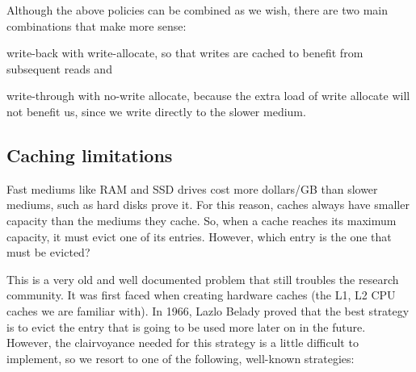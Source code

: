 Although the above policies can be combined as we wish, there are two main 
combinations that make more sense:
\begin{inparaenum}[i)]
\item write-back with write-allocate, so that writes are cached to benefit from 
	subsequent reads and
\item write-through with no-write allocate, because the extra load of write 
	allocate will not benefit us, since we write directly to the slower 
	medium.
\end{inparaenum}

\subsection{Caching limitations}

Fast mediums like RAM and SSD drives cost more dollars/GB than slower mediums, 
such as hard disks \fixme prove it. For this reason, caches always have smaller 
capacity than the mediums they cache. So, when a cache reaches its maximum 
capacity, it must evict one of its entries. However, which entry is the one 
that must be evicted?

This is a very old and well documented problem that still troubles the research 
community. It was first faced when creating hardware caches (the L1, L2 CPU 
caches we are familiar with). In 1966, Lazlo Belady proved that the best 
strategy is to evict the entry that is going to be used more later on in the 
future\cite{Belady}.  However, the clairvoyance needed for this strategy is a 
little difficult to implement, so we resort to one of the following, well-known 
strategies:

